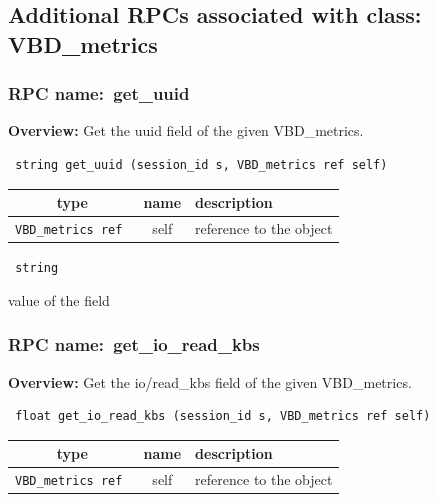 \subsection{Additional RPCs associated with class: VBD\_metrics}
\subsubsection{RPC name:~get\_uuid}

{\bf Overview:} 
Get the uuid field of the given VBD\_metrics.

\begin{verbatim} string get_uuid (session_id s, VBD_metrics ref self)\end{verbatim}



 
\vspace{0.3cm}
\begin{tabular}{|c|c|p{7cm}|}
 \hline
{\bf type} & {\bf name} & {\bf description} \\ \hline
{\tt VBD\_metrics ref } & self & reference to the object \\ \hline 

\end{tabular}

\vspace{0.3cm}

{\tt 
string
}


value of the field
\vspace{0.3cm}
\vspace{0.3cm}
\vspace{0.3cm}
\subsubsection{RPC name:~get\_io\_read\_kbs}

{\bf Overview:} 
Get the io/read\_kbs field of the given VBD\_metrics.

\begin{verbatim} float get_io_read_kbs (session_id s, VBD_metrics ref self)\end{verbatim}



 
\vspace{0.3cm}
\begin{tabular}{|c|c|p{7cm}|}
 \hline
{\bf type} & {\bf name} & {\bf description} \\ \hline
{\tt VBD\_metrics ref } & self & reference to the object \\ \hline 

\end{tabular}

